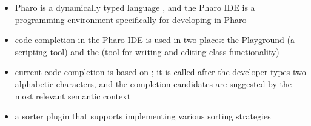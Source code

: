\begin{itemize}
    \item Pharo is a dynamically typed language  , and the Pharo IDE is a programming environment specifically  for developing in Pharo
    \item code completion in the Pharo IDE is used in two places: the Playground (a scripting tool) and the  (tool for writing and editing class functionality) 
    \item current code completion is based on ; it is called after the developer types two alphabetic characters, and the completion candidates are suggested by the most relevant semantic context
    \item {} a sorter plugin that supports implementing various sorting strategies
\end{itemize}